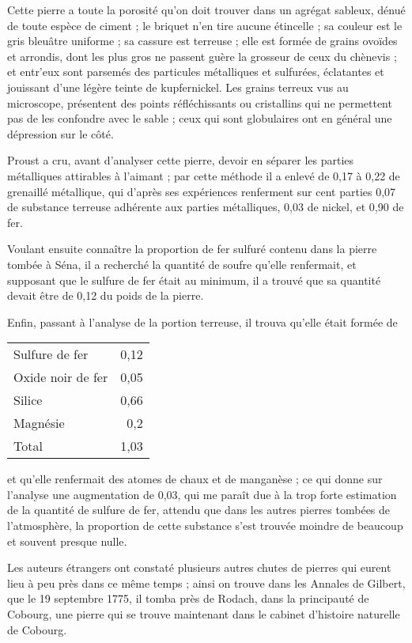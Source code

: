 \documentclass[a4paper, 12pt, oneside, french]{article}
\begin{document}
Cette pierre a toute la porosité qu'on doit trouver dans un agrégat sableux, dénué de toute espèce de ciment ; le briquet n'en tire aucune étincelle ; sa couleur est le gris bleuâtre uniforme ; sa cassure est terreuse ; elle est formée de grains ovoïdes et arrondis, dont les plus gros ne passent guère la grosseur de ceux du chènevis ; et entr'eux sont parsemés des particules métalliques et sulfurées, éclatantes et jouissant d'une légère teinte de kupfernickel. Les grains terreux vus au microscope, présentent des points réfléchissants ou cristallins qui ne permettent pas de les confondre avec le sable ; ceux qui sont globulaires ont en général une dépression sur le côté.

Proust a cru, avant d'analyser cette pierre, devoir en séparer les parties métalliques attirables à l'aimant ; par cette méthode il a enlevé de 0,17 à 0,22 de grenaillé métallique, qui d'après ses expériences renferment sur cent parties 0,07 de substance terreuse adhérente aux parties métalliques, 0,03 de nickel, et 0,90 de fer.

Voulant ensuite connaître la proportion de fer sulfuré contenu dans la pierre tombée à Séna, il a recherché la quantité de soufre qu'elle renfermait, et supposant que le sulfure de fer était au minimum, il a trouvé que sa quantité devait être de 0,12 du poids de la pierre.

Enfin, passant à l'analyse de la portion terreuse, il trouva qu'elle était formée de
\begin{table}[H]
    \centering
    \Fontauri
    \large
    \begin{tabular}{l r}
        Sulfure de fer & 0,12 \\
        Oxide noir de fer & 0,05 \\
        Silice & 0,66 \\
        Magnésie & 0,2 \\ \hline
        Total & 1,03 \\
    \end{tabular}
\end{table}
et qu'elle renfermait des atomes de chaux et de manganèse ; ce qui donne sur l'analyse une augmentation de 0,03, qui me paraît due à la trop forte estimation de la quantité de sulfure de fer, attendu que dans les autres pierres tombées de l'atmosphère, la proportion de cette substance s'est trouvée moindre de beaucoup et souvent presque nulle.

Les auteurs étrangers ont constaté plusieurs autres chutes de pierres qui eurent lieu à peu près dans ce même temps ; ainsi on trouve dans les Annales de Gilbert, que le 19 septembre 1775, il tomba près de Rodach, dans la principauté de Cobourg, une pierre qui se trouve maintenant dans le cabinet d'histoire naturelle de Cobourg.
\end{document}
